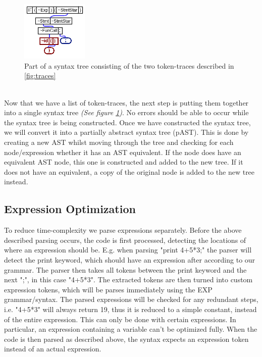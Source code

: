 \documentclass[10pt,a4paper]{article}
\begin{document}
\begin{figure}
\centering
\includegraphics[width=120px]{TokenTree.png}
\caption{Part of a syntax tree consisting of the two token-traces described in \ref{fig:traces}}
\label{fig:tracetree}
\end{figure}\\
Now that we have a list of token-traces, the next step is putting them together into a single syntax tree \textit{(See figure \ref{fig:tracetree})}. No errors should be able to occur while the syntax tree is being constructed. Once we have constructed the syntax tree, we will convert it into a partially abstract syntax tree (pAST). This is done by creating a new AST whilst moving through the tree and checking for each node/expression whether it has an AST equivalent. If the node does have an equivalent AST node, this one is constructed and added to the new tree. If it does not have an equivalent, a copy of the original node is added to the new tree instead.

\subsection{Expression Optimization}
To reduce time-complexity we parse expressions separately. Before the above described parsing occurs, the code is first processed, detecting the locations of where an expression should be. E.g. when parsing "print 4+5*3;" the parser will detect the print keyword, which should have an expression after according to our grammar. The parser then takes all tokens between the print keyword and the next ";", in this case "4+5*3". The extracted tokens are then turned into custom expression tokens, which will be parses immediately using the EXP grammar/syntax. The parsed expressions will be checked for any redundant steps, i.e. "4+5*3" will always return 19, thus it is reduced to a simple constant, instead of the entire expression. This can only be done with certain expressions. In particular, an expression containing a variable can't be optimized fully. When the code is then parsed as described above, the syntax expects an expression token instead of an actual expression.
\end{document}

